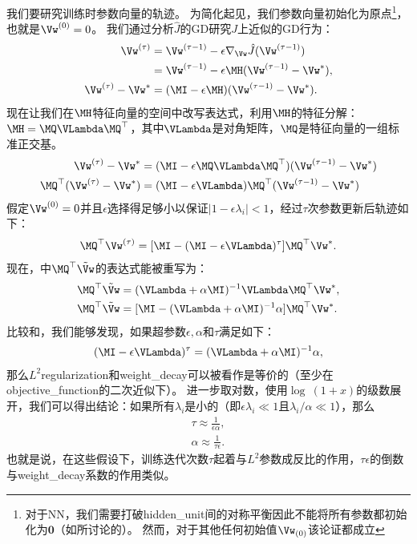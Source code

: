 
我们要研究训练时参数向量的轨迹。
为简化起见，我们参数向量初始化为原点\footnote{对于\gls{NN}，我们需要打破\gls{hidden_unit}间的对称平衡因此不能将所有参数都初始化为$\mathbf{0}$（如所讨论的）。
然而，对于其他任何初始值$\Vw_{(0)}$该论证都成立}，也就是$\Vw^{(0)} = 0$。
我们通过分析$\hat{J}$的\gls{GD}研究$J$上近似的\gls{GD}行为：
\begin{align}
\Vw^{(\tau)} &= \Vw^{(\tau-1)} -\epsilon \nabla_{\Vw} \hat{J}( \Vw^{(\tau-1)} ) \\
&=  \Vw^{(\tau-1)}  - \epsilon  \MH ( \Vw^{(\tau-1)} -  \Vw^* ), \\
\Vw^{(\tau)}  -  \Vw^* &= (\MI - \epsilon  \MH) ( \Vw^{(\tau-1)} -  \Vw^* ).
 \end{align}
现在让我们在$\MH$特征向量的空间中改写表达式，利用$\MH$的特征分解：$\MH = \MQ \VLambda \MQ^\top$，其中$\VLambda$是对角矩阵，$\MQ$是特征向量的一组标准正交基。
\begin{align}
\Vw^{(\tau)}  -  \Vw^* &= (\MI - \epsilon \MQ \VLambda \MQ^\top) ( \Vw^{(\tau-1)} -  \Vw^* ) \\
\MQ^\top (\Vw^{(\tau)}  -  \Vw^*) &= (\MI - \epsilon \VLambda)\MQ^\top ( \Vw^{(\tau-1)} -  \Vw^* )
\end{align}
假定$\Vw^{(0)} = 0$并且$\epsilon$选择得足够小以保证$|1 - \epsilon \lambda_i |<1$，经过$\tau$次参数更新后轨迹如下：
\begin{align} \label{eq:740qw}
\MQ^\top  \Vw^{(\tau)} = [\MI - (\MI - \epsilon \VLambda)^\tau] \MQ^\top  \Vw^* .
\end{align}
现在，中$\MQ^\top \tilde \Vw$的表达式能被重写为：
\begin{align}
\MQ^\top  \tilde \Vw &= (\VLambda + \alpha \MI)^{-1} \VLambda \MQ^\top  \Vw^*, \\
\MQ^\top  \tilde \Vw &= [\MI - (\VLambda + \alpha \MI)^{-1} \alpha] \MQ^\top  \Vw^*. 
\label{eq:742qw}
\end{align}
比较和，我们能够发现，如果超参数$\epsilon,\alpha$和$\tau$满足如下：
\begin{align}
(\MI - \epsilon \VLambda)^\tau =  (\VLambda + \alpha \MI)^{-1} \alpha,
\end{align}
那么$L^2$\gls{regularization}和\gls{weight_decay}可以被看作是等价的（至少在\gls{objective_function}的二次近似下）。
进一步取对数，使用$\log~(1+x)$的级数展开，我们可以得出结论：如果所有$\lambda_i$是小的（即$\epsilon \lambda_i \ll 1$且$\lambda_i / \alpha \ll 1$），那么
\begin{align}
\tau \approx \frac{1}{\epsilon \alpha}, \\
\alpha \approx \frac{1}{\tau \epsilon}.
\end{align}
也就是说，在这些假设下，训练迭代次数$\tau$起着与$L^2$参数成反比的作用，$\tau \epsilon$的倒数与\gls{weight_decay}系数的作用类似。

